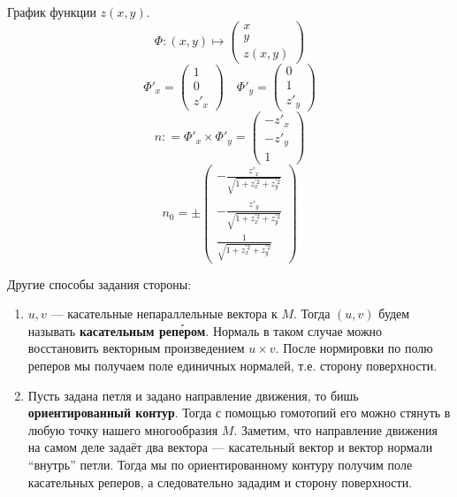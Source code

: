 \begin{example}
    График функции \(z(x, y)\).
    \[\Phi : (x, y) \mapsto \begin{pmatrix} x \\ y \\ z(x, y) \end{pmatrix}\]
    \[\Phi'_x = \begin{pmatrix} 1 \\ 0 \\ z'_x \end{pmatrix} \quad \Phi'_y = \begin{pmatrix} 0 \\ 1 \\ z'_y \end{pmatrix}\]
    \[n : = \Phi'_x \times \Phi'_y = \begin{pmatrix} - z'_x \\ - z'_y \\ 1 \end{pmatrix}\]
    \[n_0 = \pm \begin{pmatrix} - \frac{z'_x}{\sqrt{1 + z_x^{\prime 2} + z_y^{\prime 2}}} \\ - \frac{z'_y}{\sqrt{1 + z_x^{\prime 2} + z_y^{\prime 2}}}  \\ \frac{1}{\sqrt{1 + z_x^{\prime 2} + z_y^{\prime 2}}} \end{pmatrix}\]
\end{example}

Другие способы задания стороны:
\begin{enumerate}
    \item
          \(u, v\) --- касательные непараллельные вектора к \(M\). Тогда \((u, v)\) будем называть \textbf{касательным реп\'{е}ром}. Нормаль в таком случае можно восстановить векторным произведением \(u \times v\). После нормировки по полю реперов мы получаем поле единичных нормалей, т.е. сторону поверхности.
    \item Пусть задана петля и задано направление движения, то бишь \textbf{ориентированный контур}. Тогда с помощью гомотопий его можно стянуть в любую точку нашего многообразия \(M\). Заметим, что направление движения на самом деле задаёт два вектора --- касательный вектор и вектор нормали ``внутрь'' петли. Тогда мы по ориентированному контуру получим поле касательных реперов, а следовательно зададим и сторону поверхности.
\end{enumerate}


